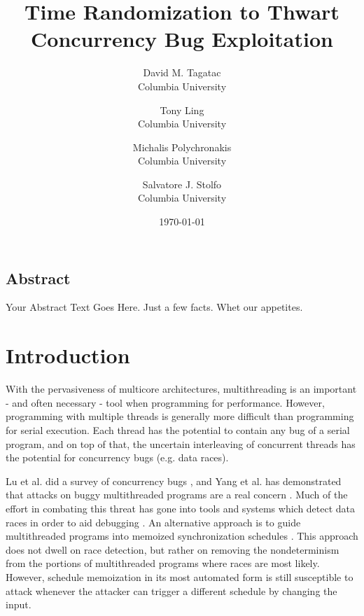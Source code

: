 \documentclass[letterpaper,twocolumn,10pt]{article}
\begin{document}
\date{\today}

\title{\Large \bf Time Randomization to Thwart Concurrency Bug Exploitation}

\author{
{\rm David M. Tagatac}\\
Columbia University
\and
{\rm Tony Ling}\\
Columbia University
\and
{\rm Michalis Polychronakis}\\
Columbia University
\and
{\rm Salvatore J. Stolfo}\\
Columbia University
} %

\maketitle



\subsection*{Abstract}
Your Abstract Text Goes Here.  Just a few facts.
Whet our appetites.

\section{Introduction}
With the pervasiveness of multicore architectures, multithreading is an important - and often necessary - tool when programming for performance.  However, programming with multiple threads is generally more difficult than programming for serial execution.  Each thread has the potential to contain any bug of a serial program, and on top of that, the uncertain interleaving of concurrent threads has the potential for concurrency bugs (e.g. data races).

Lu et al. did a survey of concurrency bugs \cite{Lu2008}, and Yang et al. has demonstrated that attacks on buggy multithreaded programs are a real concern \cite{Yang2011}.  Much of the effort in combating this threat has gone into tools and systems which detect data races in order to aid debugging \cite{Savage1997, Flanagan2004, Laadan2011, Pratikakis2011, Kasikci2013}.  An alternative approach is to guide multithreaded programs into memoized synchronization schedules \cite{Cui2011}.  This approach does not dwell on race detection, but rather on removing the nondeterminism from the portions of multithreaded programs where races are most likely.  However, schedule memoization in its most automated form is still susceptible to attack whenever the attacker can trigger a different schedule by changing the input.
\end{document}
